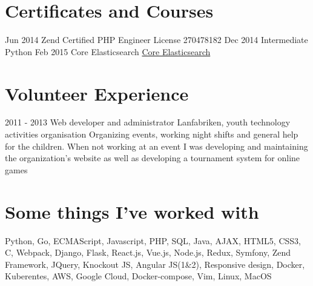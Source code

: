 \documentclass[]{friggeri-cv}
\begin{document}
\section{Certificates and Courses}
\begin{entrylist}
  \entry
    {Jun 2014}
    {Zend Certified PHP Engineer}
    {License 270478182}
    {}
  \entry
    {Dec 2014}
    {Intermediate Python}
    {}
    {}
  \entry
    {Feb 2015}
    {Core Elasticsearch}
    {\href{https://training.elastic.co/instructor-led-training/CoreESOperations}{Core Elasticsearch}}
    {}
\end{entrylist}

\section{Volunteer Experience}

\begin{entrylist}
  \entry
    {2011 - 2013}
    {Web developer and administrator}
    {Lanfabriken, youth technology activities organisation}
    {Organizing events, working night shifts and general help for the children. When not working at an event I was developing and maintaining the organization's website as well as developing a tournament system for online games}
\end{entrylist}

\section{Some things I've worked with}
 Python, Go, ECMAScript, Javascript, PHP, SQL, Java, AJAX, HTML5, CSS3, C, Webpack, Django, Flask, React.js, Vue.js, Node.js, Redux, Symfony, Zend Framework, JQuery, Knockout JS, Angular JS(1\&2), Responsive design, Docker, Kuberentes, AWS, Google Cloud, Docker-compose, Vim, Linux, MacOS
\end{document}
